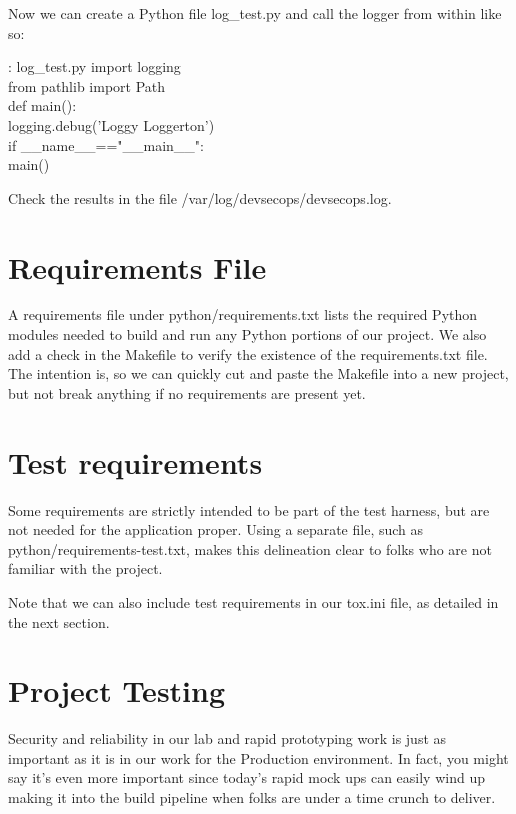 \justify
Now we can create a Python file log\_test.py and call the logger from within like so:

\begin{mybox}{\thetcbcounter: log\_test.py}
  import logging\\
  from pathlib import Path\\

  def main():\\
  logging.debug('Loggy Loggerton')\\
  if \_\_name\_\_=="\_\_main\_\_":\\
  main()
\end{mybox}

\justify
Check the results in the file /var/log/devsecops/devsecops.log.

\section{Requirements File}

\justify
A requirements file under python/requirements.txt lists
the required Python modules needed to build and run any Python portions of our  project.
We also add a check in the Makefile to verify the existence of the requirements.txt file.
The intention is, so we can quickly cut and paste the Makefile into a new project, but not break anything if no requirements are present yet.

\section{Test requirements}

\justify
Some requirements are strictly intended to be part of the test harness, but are not needed for the application proper. Using a separate file, such as python/requirements-test.txt, makes this delineation clear to
folks who are not familiar with the project.

\justify
Note that we can also include test requirements in our tox.ini file, as detailed in the next section.

\section{Project Testing}

\justify
Security and reliability in our lab and rapid prototyping work is just as important as it is in our work for the Production environment. In fact, you might say it's even more important since today's rapid mock ups
can easily wind up making it into the build pipeline when folks are under a time crunch to deliver.

